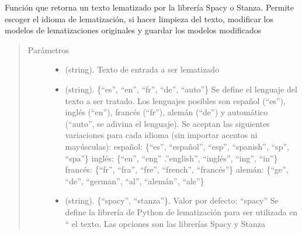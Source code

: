 \documentclass[letterpaper,10pt,openany,spanish]{sphinxmanual}
\begin{document}
\begin{fulllineitems}
\label{\detokenize{funciones/lematizacion:lematizacion.lematizar_texto}}
Función que retorna un texto lematizado por la librería Spacy o Stanza.         Permite escoger el idioma de lematización, si hacer limpieza del texto,         modificar los modelos de lematizaciones originales y guardar los modelos         modificados
\begin{quote}\begin{description}
\item[{Parámetros}] \leavevmode\begin{itemize}
\item {} 
 \textendash{} (string). Texto de entrada a ser lematizado

\item {} 
 \textendash{} (string). \{“es”, “en”, “fr”, “de”, “auto”\}  Se define el         lenguaje del texto a ser tratado. Los lenguajes posibles son español         (“es”), inglés (“en”), francés (“fr”), alemán (“de”) y automático (“auto”,         se adivina el lenguaje). Se aceptan las siguientes variaciones para cada         idioma (sin importar acentos ni mayúsculas):                español: \{“es”, “español”, “esp”, “spanish”, “sp”, “spa”\} 
 inglés: \{“en”, “eng” .”english”, “inglés”, “ing”, “in”\} 
 francés: \{“fr”, “fra”, “fre”, “french”, “francés”\} 
 alemán: \{“ge”, “de”, “german”, “al”, “alemán”, “ale”\}   

\item {} 
 \textendash{} (string). \{“spacy”, “stanza”\}. Valor por defecto: “spacy”         Se define la librería de Python de lematización para ser utilizada en “
el texto. Las opciones son las librerías Spacy y Stanza


\end{itemize}
\end{description}
\end{quote}
\end{fulllineitems}
\end{document}
